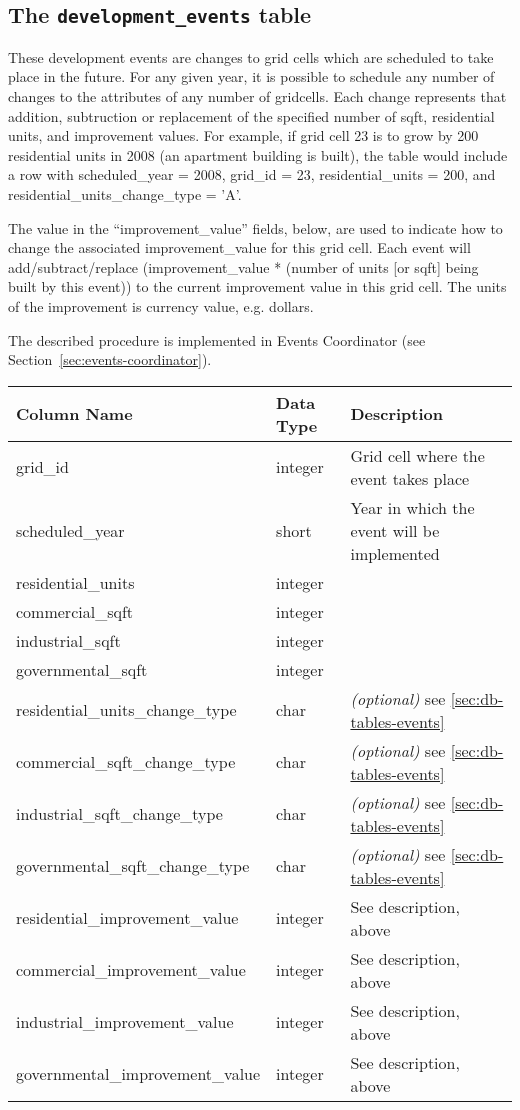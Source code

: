 \subsection{The {\tt development_events} table}
\label{sec:db-tables-development-events-exogenous}

These development events are changes to grid cells which are scheduled to take
place
in the future. For any given year, it is possible to schedule any number of
changes to the attributes of any number of gridcells. Each change represents
that addition, subtruction or replacement of the specified number of sqft, residential units, and
improvement values.  For example, if
grid cell 23 is to grow by 200 residential units in 2008 (an apartment building
is built), the table would include a row with scheduled_year = 2008, grid_id =
23, residential_units = 200, and residential_units_change_type = 'A'.

The value in the ``improvement_value'' fields, below, are used to indicate how
to change the associated improvement_value for this grid cell. Each event will
add/subtract/replace (improvement_value * (number
of units [or sqft] being built by this event)) to the current improvement value
in
this grid cell.  The units of the improvement is currency value, e.g. dollars.

The described procedure is implemented in Events Coordinator (see Section~\ref{sec:events-coordinator}).

\begin{tabular}{p{2in}lp{3.5in}}
\textbf{Column Name} & \textbf{Data Type} & \textbf{Description} \\
\hline
grid_id & integer & Grid cell where the event takes place  \\
\hline
scheduled_year &short & Year in which the event will be implemented  \\
\hline
residential_units & integer & \\
\hline
commercial_sqft & integer & \\
\hline
industrial_sqft & integer & \\
\hline
governmental_sqft & integer & \\
\hline
residential_units_change_type & char & \emph{(optional) } see \ref{sec:db-tables-events}\\
\hline
commercial_sqft_change_type & char & \emph{(optional) } see \ref{sec:db-tables-events}\\
\hline
industrial_sqft_change_type & char & \emph{(optional) } see \ref{sec:db-tables-events}\\
\hline
governmental_sqft_change_type & char & \emph{(optional) } see \ref{sec:db-tables-events}\\
\hline
residential_improvement_value & integer & See description, above  \\
\hline
commercial_improvement_value & integer & See description, above  \\
\hline
industrial_improvement_value & integer & See description, above  \\
\hline
governmental_improvement_value & integer & See description, above  \\
\hline

\end{tabular}

